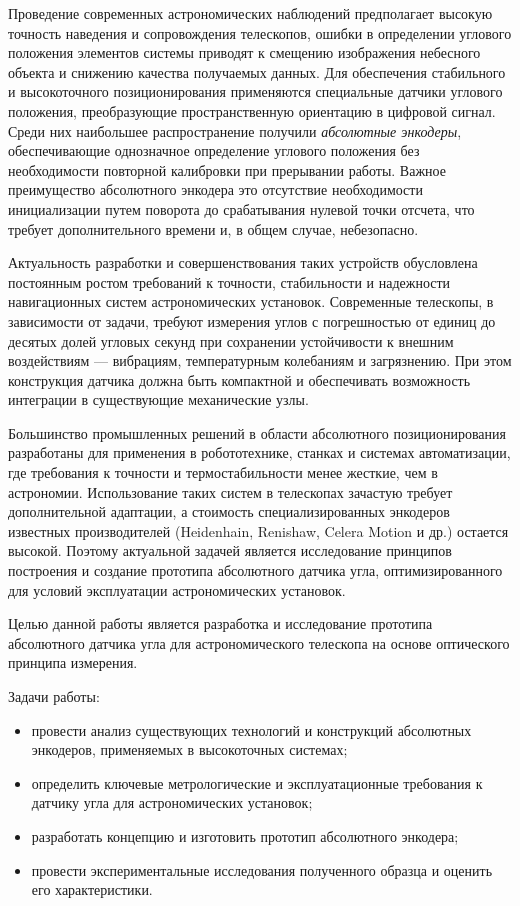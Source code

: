 Проведение современных астрономических наблюдений предполагает высокую точность наведения и сопровождения телескопов, ошибки в определении углового положения элементов системы приводят к смещению изображения небесного объекта и снижению качества получаемых данных. Для обеспечения стабильного и высокоточного позиционирования применяются специальные датчики углового положения, преобразующие пространственную ориентацию в цифровой сигнал. Среди них наибольшее распространение получили \emph{абсолютные энкодеры}, обеспечивающие однозначное определение углового положения без необходимости повторной калибровки при прерывании работы. Важное преимущество абсолютного энкодера это отсутствие необходимости инициализации путем поворота до срабатывания нулевой точки отсчета, что требует дополнительного времени и, в общем случае, небезопасно.

Актуальность разработки и совершенствования таких устройств обусловлена постоянным ростом требований к точности, стабильности и надежности навигационных систем астрономических установок. Современные телескопы, в зависимости от задачи, требуют измерения углов с погрешностью от единиц до десятых долей угловых секунд при сохранении устойчивости к внешним воздействиям — вибрациям, температурным колебаниям и загрязнению. При этом конструкция датчика должна быть компактной и обеспечивать возможность интеграции в существующие механические узлы.

Большинство промышленных решений в области абсолютного позиционирования разработаны для применения в робототехнике, станках и системах автоматизации, где требования к точности и термостабильности менее жесткие, чем в астрономии. Использование таких систем в телескопах зачастую требует дополнительной адаптации, а стоимость специализированных энкодеров известных производителей (Heidenhain, Renishaw, Celera Motion и др.) остается высокой. Поэтому актуальной задачей является исследование принципов построения и создание прототипа абсолютного датчика угла, оптимизированного для условий эксплуатации астрономических установок.  

Целью данной работы является разработка и исследование прототипа абсолютного датчика угла для астрономического телескопа на основе оптического принципа измерения.

Задачи работы:
\begin{itemize}
    \item провести анализ существующих технологий и конструкций абсолютных энкодеров, применяемых в высокоточных системах;  
    \item определить ключевые метрологические и эксплуатационные требования к датчику угла для астрономических установок;  
    \item разработать концепцию и изготовить прототип абсолютного энкодера; 
    \item провести экспериментальные исследования полученного образца и оценить его характеристики.  
\end{itemize}

